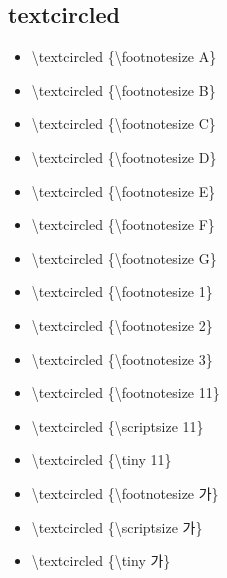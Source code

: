 	\subsection{ textcircled }
	\begin{itemize}[itemsep=-0.5em,leftmargin=4em]
	\item[	\textcircled {\footnotesize A} ] \textbackslash textcircled \{\textbackslash footnotesize A\}
	\item[	\textcircled {\footnotesize B} ] \textbackslash textcircled \{\textbackslash footnotesize B\}
	\item[	\textcircled {\footnotesize C} ] \textbackslash textcircled \{\textbackslash footnotesize C\}
	\item[	\textcircled {\footnotesize D} ] \textbackslash textcircled \{\textbackslash footnotesize D\}
	\item[	\textcircled {\footnotesize E} ] \textbackslash textcircled \{\textbackslash footnotesize E\}
	\item[	\textcircled {\footnotesize F} ] \textbackslash textcircled \{\textbackslash footnotesize F\}
	\item[	\textcircled {\footnotesize G} ] \textbackslash textcircled \{\textbackslash footnotesize G\}


	\item[	\textcircled {\footnotesize 1} ] \textbackslash textcircled \{\textbackslash footnotesize 1\}
	\item[	\textcircled {\footnotesize 2} ] \textbackslash textcircled \{\textbackslash footnotesize 2\}
	\item[	\textcircled {\footnotesize 3} ] \textbackslash textcircled \{\textbackslash footnotesize 3\}

	\item[	\textcircled {\footnotesize 11}] \textbackslash textcircled \{\textbackslash footnotesize 11\}
	\item[	\textcircled {\scriptsize   11}] \textbackslash textcircled \{\textbackslash scriptsize   11\}
	\item[	\textcircled {\tiny         11}] \textbackslash textcircled \{\textbackslash tiny         11\}


	\item[	\textcircled {\footnotesize 가}] \textbackslash textcircled \{\textbackslash footnotesize 가\}
	\item[	\textcircled {\scriptsize   가}] \textbackslash textcircled \{\textbackslash scriptsize   가\}
	\item[	\textcircled {\tiny         가}] \textbackslash textcircled \{\textbackslash tiny         가\}

	\end{itemize}

